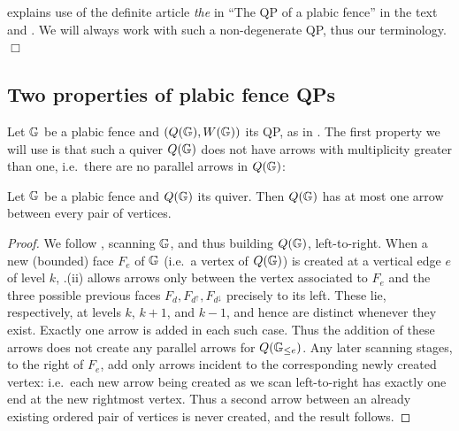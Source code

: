 \begin{remark}  explains use of the definite article {\it the} in ``The QP of a plabic fence'' in the text and . We will always work with such a non-degenerate QP, thus our terminology.\hfill$\Box$
\end{remark}

\subsection{Two properties of plabic fence QPs}\label{ssec:properties_plabic_QP} Let $\mathbb G$ be a plabic fence and $(Q(\mathbb G),W(\mathbb G))$ its QP, as in . The first property we will use is that such a quiver $Q(\mathbb G)$ does not have arrows with multiplicity greater than one, i.e.~there are no parallel arrows in $Q(\mathbb G)$:

\begin{lemma}\label{lem:no-parallel}
Let $\mathbb G$ be a plabic fence and $Q(\mathbb G)$ its quiver. Then $Q(\mathbb G)$ has at most one arrow between every pair of vertices.
\end{lemma}

\begin{proof}
We follow , scanning $\mathbb G$, and thus building $Q(\mathbb G)$, left-to-right. When a new (bounded) face $F_e$ of $\mathbb G$ (i.e.~a vertex of $Q(\mathbb G)$) is created at a vertical edge $e$ of level $k$, .(ii) allows arrows only between the vertex associated to $F_e$ and the three possible previous faces $F_d,F_{d^\uparrow},F_{d^\downarrow}$ precisely to its left. These lie, respectively, at levels $k$, $k+1$, and $k-1$, and hence are distinct whenever they exist. Exactly one arrow is added in each such case. Thus the addition of these arrows does not create any parallel arrows for $Q(\mathbb G_{\leq e})$. Any later scanning stages, to the right of $F_e$, add only arrows incident to the corresponding newly created vertex: i.e.~each new arrow being created as we scan left-to-right has exactly one end at the new rightmost vertex. Thus a second arrow between an already existing ordered pair of vertices is never created, and the result follows.
\end{proof}

